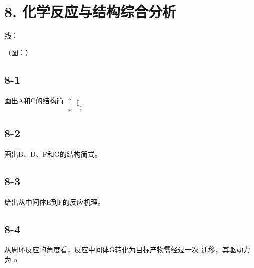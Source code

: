 \section*{8. 化学反应与结构综合分析}
线：

（图：）

\subsection*{8-1}
画出A和C的结构简 $\updownarrow \updownarrow _ { \updownarrow }$

\subsection*{8-2}
画出B、D、F和G的结构简式。

\subsection*{8-3}
给出从中间体E到F的反应机理。

\subsection*{8-4}
从周环反应的⻆度看，反应中间体G转化为⽬标产物需经过⼀次 迁移，其驱动⼒为 o
